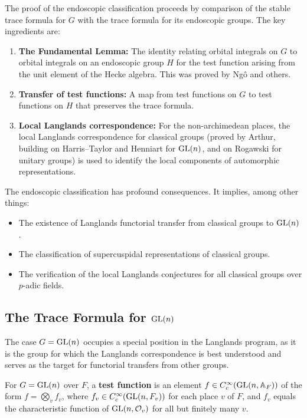 \begin{remark}
The proof of the endoscopic classification proceeds by comparison of the stable trace formula for $G$ with the trace formula for its endoscopic groups. The key ingredients are:
\begin{enumerate}
    \item \textbf{The Fundamental Lemma:} The identity relating orbital integrals on $G$ to orbital integrals on an endoscopic group $H$ for the test function arising from the unit element of the Hecke algebra. This was proved by Ng\^o and others.
    \item \textbf{Transfer of test functions:} A map from test functions on $G$ to test functions on $H$ that preserves the trace formula.
    \item \textbf{Local Langlands correspondence:} For the non-archimedean places, the local Langlands correspondence for classical groups (proved by Arthur, building on Harris--Taylor and Henniart for $\operatorname{GL}(n)$, and on Rogawski for unitary groups) is used to identify the local components of automorphic representations.
\end{enumerate}
\end{remark}

The endoscopic classification has profound consequences. It implies, among other things:
\begin{itemize}
    \item The existence of Langlands functorial transfer from classical groups to $\operatorname{GL}(n)$.
    \item The classification of supercuspidal representations of classical groups.
    \item The verification of the local Langlands conjectures for all classical groups over $p$-adic fields.
\end{itemize}

\subsection{The Trace Formula for \texorpdfstring{$\operatorname{GL}(n)$}{GL(n)}}

The case $G = \operatorname{GL}(n)$ occupies a special position in the Langlands program, as it is the group for which the Langlands correspondence is best understood and serves as the target for functorial transfers from other groups.

\begin{definition}
For $G = \operatorname{GL}(n)$ over $F$, a \textbf{test function} is an element $f \in C_c^\infty(\operatorname{GL}(n, \mathbb{A}_F))$ of the form $f = \bigotimes_v f_v$, where $f_v \in C_c^\infty(\operatorname{GL}(n, F_v))$ for each place $v$ of $F$, and $f_v$ equals the characteristic function of $\operatorname{GL}(n, \mathcal{O}_v)$ for all but finitely many $v$.
\end{definition}

